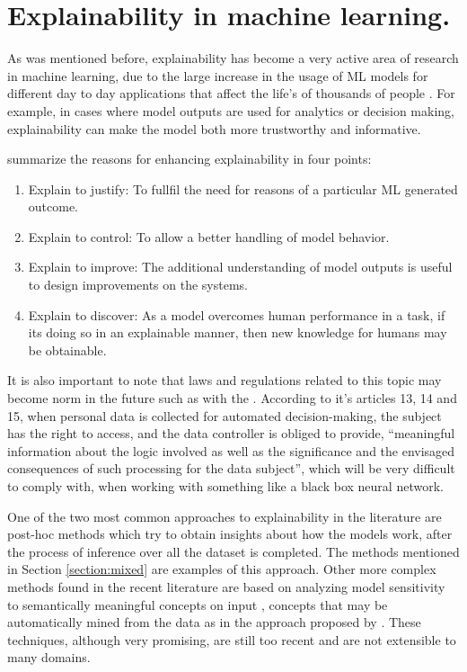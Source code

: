 \section{ Explainability in machine learning.}

As was mentioned before, explainability has become a very active area of research
in machine learning, due to the large increase in the usage of ML models
for different day to day applications that affect the life's of thousands of people
\cite{ras_explanation}. For example, in cases where model outputs are used for analytics or decision
making, explainability can make the model both more trustworthy and informative.

 summarize the reasons for enhancing explainability in four points:

\begin{enumerate}
	\item Explain to justify: To fullfil the need for reasons of a particular ML
	generated outcome.
	\item Explain to control: To allow a better handling of model behavior.
	\item Explain to improve: The additional understanding of model outputs is useful
	to design improvements on the systems.
	\item Explain to discover: As a model overcomes human performance in a task, if its
	doing so in an explainable manner, then new knowledge for humans may be obtainable.

\end{enumerate}

It is also important to note that laws and regulations related to this topic may become norm
in the future such as with the . According to it's articles
13, 14 and 15, when personal data is collected for automated decision-making,
the subject has the right to access, and the data controller is obliged to provide,
“meaningful information about the logic involved  as well as the significance and the envisaged
consequences of such processing for the data subject”, which will be very difficult to comply with,
when working with something like a black box neural network.

One of the two most common approaches to explainability in the literature are post-hoc methods
\cite{adadi_xai} which try to obtain insights about how the models work, after the process of
inference over all the dataset is completed. The methods mentioned in Section
\ref{section:mixed} are examples of this approach. Other more complex methods found in the recent literature
are based on analyzing model sensitivity to semantically meaningful concepts on input \cite{kim_tcav, shi_concept},
concepts that may be automatically mined from the data as in the approach proposed by . These techniques, although
very promising, are still too recent and are not extensible to many domains.

